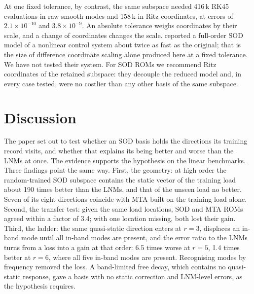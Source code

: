 \documentclass[preprint,12pt]{elsarticle}
\begin{document}
At one fixed tolerance, by contrast, the same subspace needed 416\,k RK45 evaluations in raw smooth modes and 158\,k in Ritz coordinates, at errors of $2.1\times10^{-10}$ and $3.8\times10^{-9}$. An absolute tolerance weighs coordinates by their scale, and a change of coordinates changes the scale. \citet{Ilbeigi2018} reported a full-order SOD model of a nonlinear control system about twice as fast as the original; that is the size of difference coordinate scaling alone produced here at a fixed tolerance. We have not tested their system.
For SOD ROMs we recommend Ritz coordinates of the retained subspace: they decouple the reduced model and, in every case tested, were no costlier than any other basis of the same subspace.


\section{Discussion}\label{sec:disc}
The paper set out to test whether an SOD basis holds the directions its training record visits, and whether that explains its being better and worse than the LNMs at once.
The evidence supports the hypothesis on the linear benchmarks. Three findings point the same way.
First, the geometry: at high order the random-trained SOD subspace contains the static vector of the training load about 190 times better than the LNMs, and that of the unseen load no better. Seven of its eight directions coincide with MTA built on the training load alone.
Second, the transfer test: given the same load locations, SOD and MTA ROMs agreed within a factor of 3.4; with one location missing, both lost their gain.
Third, the ladder: the same quasi-static direction enters at $r=3$, displaces an in-band mode until all in-band modes are present, and the error ratio to the LNMs turns from a loss into a gain at that order: 6.5 times worse at $r=5$, 1.4 times better at $r=6$, where all five in-band modes are present. Recognising modes by frequency removed the loss.
A band-limited free decay, which contains no quasi-static response, gave a basis with no static correction and LNM-level errors, as the hypothesis requires.
\end{document}
